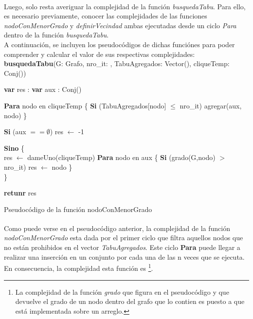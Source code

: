 \paragraph{}
Luego, solo resta averiguar la complejidad de la función \textit{busquedaTabu}. Para ello, es necesario previamente, conocer las complejidades de las funciones \textit{nodoConMenorGrado} y \textit{definirVecindad} ambas ejecutadas desde un ciclo \textit{Para} dentro de la función \textit{busquedaTabu}.\\
A continuación, se incluyen los pseudocódigos de dichas funciónes para poder comprender y calcular el valor de sus respectivas complejidades: \\

\textbf{busquedaTabu}(G: Grafo, nro\_it: \entero, TabuAgregados: Vector(\entero), cliqueTemp: Conj(\entero)) \\
\begin{algorithm}[H]
\footnotesize 
\linesnumbered
\incmargin{3em}

	\BlankLine
	\textbf{var} res : \entero											{}
	\textbf{var} aux : Conj(\entero)										

	\BlankLine \BlankLine
	\textbf{Para} nodo en cliqueTemp \{		 							
	\tab \textbf{Si} (TabuAgregados[nodo] $\leq$ nro\_it) 				
	\tab \tab agregar(aux, nodo)											
	\}
	
	\BlankLine \BlankLine
	\textbf{Si} (aux $== \emptyset$) 									
	\tab res $\leftarrow$ -1												

	\BlankLine \BlankLine
	\textbf{Sino}  \{ \\		 							
	\tab res $\leftarrow$ dameUno(cliqueTemp)							
	\tab \textbf{Para} nodo en aux \{			 						
	\tab \tab \textbf{Si} (grado(G,nodo) $>$ nro\_it) 					
	\tab \tab \tab res $\leftarrow$ nodo								
	\tab \} \\
	\}
	
	\BlankLine \BlankLine
	\textbf{retunr} res														
\caption{Pseudocódigo de la función nodoConMenorGrado} 
\normalsize
\end{algorithm}

\paragraph{}
Como puede verse en el pseudocódigo anterior, la complejidad de la función \textit{nodoConMenorGrado} esta dada por el primer ciclo que filtra aquellos nodos que no están prohibidos en el vector \textit{TabuAgregados}. Este ciclo \textbf{Para} puede llegar a realizar una inserción en un conjunto por cada una de las n veces que se ejecuta. En consecuencia, la complejidad esta función es  \footnote{La complejidad de la función \textit{grado} que figura en el pseudocódigo y que devuelve el grado de un nodo dentro del grafo que lo contien es  puesto a que está implementada sobre un arreglo.}.

